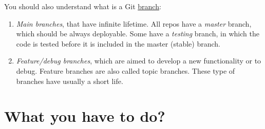 You should also understand what is a
Git \href{https://docs.gitlab.com/ee/topics/gitlab_flow.html}{branch}:
\begin{enumerate}
\item \emph{Main branches}, that have infinite lifetime. All repos
  have a \emph{master} branch, which should be always deployable. Some
  have a \emph{testing} branch, in which the code is tested before it
  is included in the master (stable) branch.
\item \emph{Feature/debug branches}, which are aimed to develop a new
  functionality or to debug. Feature branches are also called topic
  branches. These type of branches have usually a short life.
\end{enumerate}

\section{What you have to do?}

